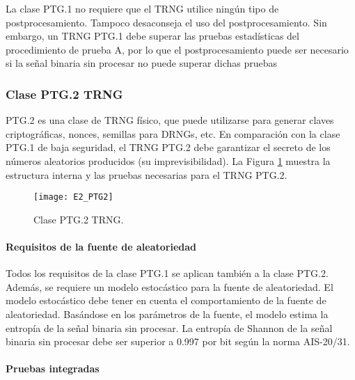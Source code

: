                 La clase PTG.1 no requiere que el TRNG utilice ningún tipo de postprocesamiento. Tampoco desaconseja el uso del postprocesamiento. Sin embargo, un TRNG PTG.1 debe superar las pruebas estadísticas del procedimiento de prueba A, por lo que el postprocesamiento puede ser necesario si la señal binaria sin procesar no puede superar dichas pruebas

            \subsubsection{Clase PTG.2 TRNG}
            
                PTG.2 es una clase de TRNG físico, que puede utilizarse para generar claves criptográficas, nonces, semillas para DRNGs, etc. En comparación con la clase PTG.1 de baja seguridad, el TRNG PTG.2 debe garantizar el secreto de los números aleatorios producidos (su imprevisibilidad). La Figura \ref{fig:E2_PTG2} muestra la estructura interna y las pruebas necesarias para el TRNG PTG.2.

                \begin{figure}[hbtp]
                    \centering
                    \texttt{[image: E2\_PTG2]}
                    \caption{Clase PTG.2 TRNG.}
                    \label{fig:E2_PTG2}
                \end{figure}
            
                \paragraph{Requisitos de la fuente de aleatoriedad\\}
                
                Todos los requisitos de la clase PTG.1 se aplican también a la clase PTG.2. Además, se requiere un modelo estocástico para la fuente de aleatoriedad. El modelo estocástico debe tener en cuenta el comportamiento de la fuente de aleatoriedad. Basándose en los parámetros de la fuente, el modelo estima la entropía de la señal binaria sin procesar. La entropía de Shannon de la señal binaria sin procesar debe ser superior a 0.997 por bit según la norma AIS-20/31.
                
                \paragraph{Pruebas integradas\\}
                
